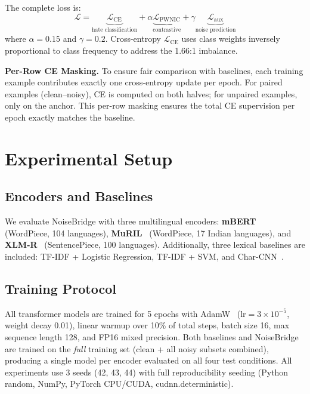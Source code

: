 \documentclass[conference]{IEEEtran}
\begin{document}
The complete loss is:
\begin{equation}
\mathcal{L} = \underbrace{\mathcal{L}_\text{CE}}_{\text{hate classification}}
+ \alpha \underbrace{\mathcal{L}_{\text{PWNIC}}}_{\text{contrastive}}
+ \gamma \underbrace{\mathcal{L}_\text{aux}}_{\text{noise prediction}}
\label{eq:total}
\end{equation}
where $\alpha = 0.15$ and $\gamma = 0.2$. Cross-entropy $\mathcal{L}_\text{CE}$ uses class weights inversely proportional to class frequency to address the 1.66:1 imbalance.

\textbf{Per-Row CE Masking.} To ensure fair comparison with baselines, each training example contributes exactly one cross-entropy update per epoch. For paired examples (clean--noisy), CE is computed on both halves; for unpaired examples, only on the anchor. This per-row masking ensures the total CE supervision per epoch exactly matches the baseline.


\section{Experimental Setup}
\label{sec:experiments}

\subsection{Encoders and Baselines}

We evaluate NoiseBridge with three multilingual encoders: \textbf{mBERT}~\cite{devlin2019bert} (WordPiece, 104 languages), \textbf{MuRIL}~\cite{khanuja2021muril} (WordPiece, 17 Indian languages), and \textbf{XLM-R}~\cite{conneau2020xlmr} (SentencePiece, 100 languages). Additionally, three lexical baselines are included: TF-IDF + Logistic Regression, TF-IDF + SVM, and Char-CNN~\cite{zhang2015character}.

\subsection{Training Protocol}

All transformer models are trained for 5 epochs with AdamW~\cite{loshchilov2019decoupled} ($\text{lr} = 3 \times 10^{-5}$, weight decay 0.01), linear warmup over 10\% of total steps, batch size 16, max sequence length 128, and FP16 mixed precision. Both baselines and NoiseBridge are trained on the \textit{full} training set (clean + all noisy subsets combined), producing a single model per encoder evaluated on all four test conditions. All experiments use 3 seeds (42, 43, 44) with full reproducibility seeding (Python random, NumPy, PyTorch CPU/CUDA, cudnn.deterministic).
\end{document}
